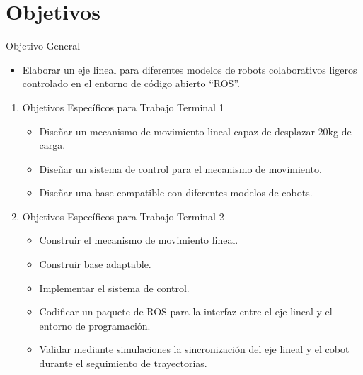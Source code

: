 \section{Objetivos}
Objetivo General
\begin{itemize}
    \item Elaborar un eje lineal para diferentes modelos de robots colaborativos ligeros controlado en el entorno de código abierto “ROS”.
\end{itemize}
\begin{enumerate}
    \item Objetivos Específicos para Trabajo Terminal 1
\begin{itemize}
    \item Diseñar un mecanismo de movimiento lineal capaz de desplazar 20kg de carga.
    \item Diseñar un sistema de control para el mecanismo de movimiento.
    \item Diseñar una base compatible con diferentes modelos de cobots.
\end{itemize}

\item Objetivos Específicos para Trabajo Terminal 2
\begin{itemize}
    \item Construir el mecanismo de movimiento lineal.
    \item Construir base adaptable.
    \item Implementar el sistema de control.
    \item Codificar un paquete de ROS para la interfaz entre el eje lineal y el entorno de programación.
    \item Validar mediante simulaciones la sincronización del eje lineal y el cobot durante el seguimiento de trayectorias.
\end{itemize}

\end{enumerate}